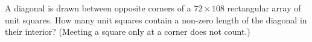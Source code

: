 A diagonal is drawn between opposite corners of a $72\times108$ rectangular array of unit squares. How many unit squares contain a non-zero length of the diagonal in their interior? (Meeting a square only at a corner does not count.)

